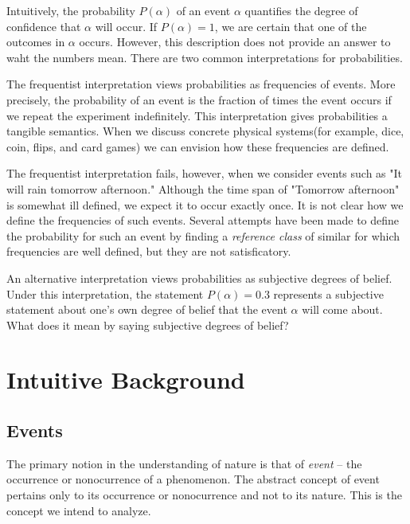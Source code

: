 \documentclass[a4paper]{article}
\begin{document}
	Intuitively, the probability $P(\alpha)$ of an event $\alpha$
	quantifies the degree of confidence that $\alpha$ will occur. If
	$P(\alpha) = 1$, we are certain that one of the outcomes in $\alpha$
	occurs. However, this description does not provide an answer to waht
	the numbers mean. There are two common interpretations for
	probabilities.\cite{koller2009probabilistic}

	The frequentist interpretation views probabilities as frequencies of
	events. More precisely, the probability of an event is the fraction of
	times the event occurs if we repeat the experiment indefinitely. This
	interpretation gives probabilities a tangible semantics. When we
	discuss concrete physical systems(for example, dice, coin, flips, and
	card games) we can envision how these frequencies are
	defined.\cite{koller2009probabilistic}

	The frequentist interpretation fails, however, when we consider events
	such as "It will rain tomorrow afternoon." Although the time span of
	"Tomorrow afternoon" is somewhat ill defined, we expect it to occur
	exactly once. It is not clear how we define the frequencies of such
	events. Several attempts have been made to define the probability for
	such an event by finding a \textit{reference class} of similar for
	which frequencies are well defined, but they are not
	satisficatory.\cite{koller2009probabilistic}

	An alternative interpretation views probabilities as subjective
	degrees of belief. Under this interpretation, the statement $P(\alpha)
	= 0.3$ represents a subjective statement about one's own degree of
	belief that the event $\alpha$ will come
	about.\cite{koller2009probabilistic} What does it mean by saying
	subjective degrees of belief?

\section{Intuitive Background}

\subsection{Events}

The primary notion in the understanding of nature is that of
\textit{event} -- the occurrence or nonocurrence of a phenomenon. The
abstract concept of event pertains only to its occurrence or
nonocurrence and not to its nature. This is the concept we intend to
analyze.\cite{1977probability}
\end{document}
